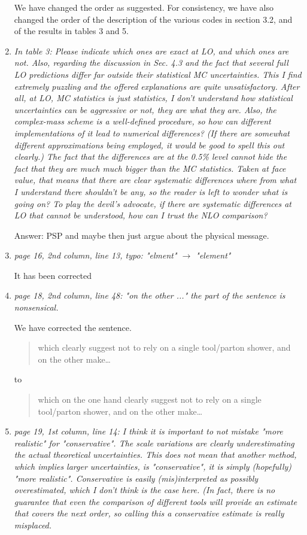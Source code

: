 \documentclass{report}
\begin{document}
\begin{enumerate}
We have changed the order as suggested.
For consistency, we have also changed the order of the description of the various codes in section 3.2, and of the
results in tables 3 and 5.

\item \emph{In table 3: Please indicate which ones are exact at LO, and which ones are not. Also, regarding the discussion in Sec. 4.3 and the fact that several full LO
predictions differ far outside their statistical MC uncertainties. This I find
extremely puzzling and the offered explanations are quite unsatisfactory. After
all, at LO, MC statistics is just statistics, I don't understand how statistical
uncertainties can be aggressive or not, they are what they are.
Also, the complex-mass scheme is a well-defined procedure, so how can different implementations of it lead to numerical differences? (If there are somewhat different approximations being employed, it would be good to spell this out clearly.) The fact that the differences are at the 0.5\% level
cannot hide the fact that they are much much bigger than the MC statistics.
Taken at face value, that means that there are clear systematic differences where from what I understand there shouldn't be any, so the reader is left to wonder what is going on? To play the devil's advocate, if there are systematic differences at LO that cannot be understood, how can I trust the NLO comparison?}

Answer: PSP and maybe then just argue about the physical message.

\item \emph{ page 16, 2nd column, line 13, typo: "elment" $\to$ "element"}

It has been corrected

\item \emph{ page 18, 2nd column, line 48: "on the other ..." the part of the sentence is
    nonsensical.}

We have corrected the sentence.
\begin{quote}
which clearly suggest not to rely on a single tool/parton shower, and on the other make\ldots
\end{quote}
to
\begin{quote}
which on the one hand clearly suggest not to rely on a single tool/parton shower, and on the other make\ldots
\end{quote}
    
\item \emph{page 19, 1st column, line 14:
I think it is important to not mistake "more realistic" for "conservative". The
scale variations are clearly underestimating the actual theoretical uncertainties. This does not mean that another method, which implies larger uncertainties, is "conservative", it is simply (hopefully) "more realistic". Conservative is easily (mis)interpreted as possibly overestimated, which I don't think is the case here. (In fact, there is no guarantee that even the comparison of different tools will provide an estimate that covers the next order, so calling this a conservative estimate is really misplaced.}


\end{enumerate}
\end{document}

